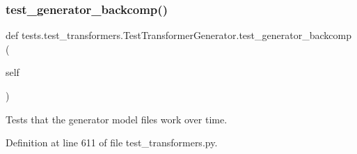 \subsubsection{\texorpdfstring{test\+\_\+generator\+\_\+backcomp()}{test\_generator\_backcomp()}}
{\footnotesize\ttfamily def tests.\+test\+\_\+transformers.\+Test\+Transformer\+Generator.\+test\+\_\+generator\+\_\+backcomp (\begin{DoxyParamCaption}\item[{}]{self }\end{DoxyParamCaption})}

\begin{DoxyVerb}Tests that the generator model files work over time.
\end{DoxyVerb}
 

Definition at line 611 of file test\+\_\+transformers.\+py.


